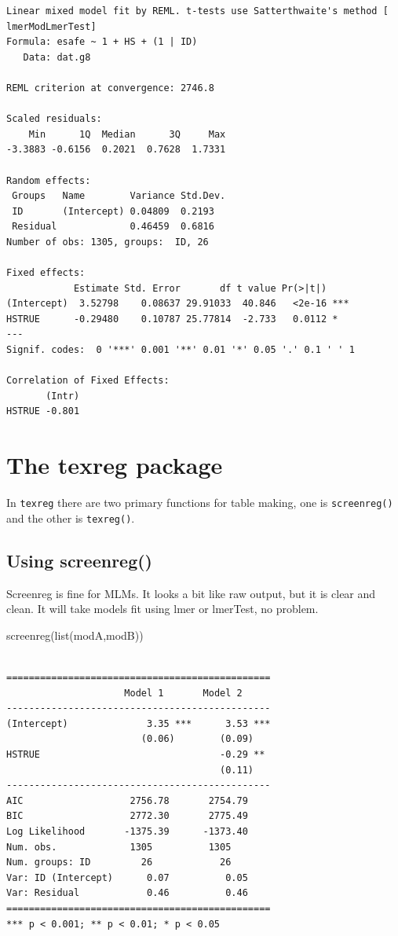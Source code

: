 \documentclass[
  letterpaper,
  DIV=11,
  numbers=noendperiod]{scrreprt}
\newenvironment{Shaded}{}{}
\newcommand{\FunctionTok}[1]{\textcolor[rgb]{0.02,0.16,0.49}{#1}}
\newcommand{\NormalTok}[1]{#1}
\begin{document}
\begin{verbatim}
Linear mixed model fit by REML. t-tests use Satterthwaite's method [
lmerModLmerTest]
Formula: esafe ~ 1 + HS + (1 | ID)
   Data: dat.g8

REML criterion at convergence: 2746.8

Scaled residuals: 
    Min      1Q  Median      3Q     Max 
-3.3883 -0.6156  0.2021  0.7628  1.7331 

Random effects:
 Groups   Name        Variance Std.Dev.
 ID       (Intercept) 0.04809  0.2193  
 Residual             0.46459  0.6816  
Number of obs: 1305, groups:  ID, 26

Fixed effects:
            Estimate Std. Error       df t value Pr(>|t|)    
(Intercept)  3.52798    0.08637 29.91033  40.846   <2e-16 ***
HSTRUE      -0.29480    0.10787 25.77814  -2.733   0.0112 *  
---
Signif. codes:  0 '***' 0.001 '**' 0.01 '*' 0.05 '.' 0.1 ' ' 1

Correlation of Fixed Effects:
       (Intr)
HSTRUE -0.801
\end{verbatim}

\section{The texreg package}\label{the-texreg-package}

In \texttt{texreg} there are two primary functions for table making, one
is \texttt{screenreg()} and the other is \texttt{texreg()}.

\subsection{Using screenreg()}\label{using-screenreg}

Screenreg is fine for MLMs. It looks a bit like raw output, but it is
clear and clean. It will take models fit using lmer or lmerTest, no
problem.

\begin{Shaded}
\begin{Highlighting}[]
\FunctionTok{screenreg}\NormalTok{(}\FunctionTok{list}\NormalTok{(modA,modB))}
\end{Highlighting}
\end{Shaded}

\begin{verbatim}

===============================================
                     Model 1       Model 2     
-----------------------------------------------
(Intercept)              3.35 ***      3.53 ***
                        (0.06)        (0.09)   
HSTRUE                                -0.29 ** 
                                      (0.11)   
-----------------------------------------------
AIC                   2756.78       2754.79    
BIC                   2772.30       2775.49    
Log Likelihood       -1375.39      -1373.40    
Num. obs.             1305          1305       
Num. groups: ID         26            26       
Var: ID (Intercept)      0.07          0.05    
Var: Residual            0.46          0.46    
===============================================
*** p < 0.001; ** p < 0.01; * p < 0.05
\end{verbatim}
\end{document}
